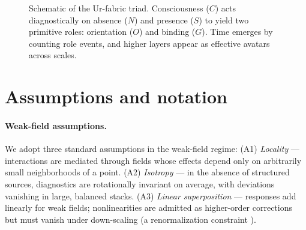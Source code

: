 \documentclass[12pt,a4paper,oneside]{scrreprt}
\begin{document}
\begin{figure}[ht]
\centering
{}
\caption{Schematic of the Ur-fabric triad. Consciousness ($C$) acts diagnostically on absence ($N$) and presence ($S$) to yield two primitive roles: orientation ($O$) and binding ($G$). Time emerges by counting role events, and higher layers appear as effective avatars across scales.}
\label{fig:ur-fabric-triad}
\end{figure}

\section{Assumptions and notation}\label{sec:ur-assumptions}

\paragraph{Weak-field assumptions.} 
We adopt three standard assumptions in the weak-field regime:  
(A1) \emph{Locality} --- interactions are mediated through fields whose effects depend only on arbitrarily small neighborhoods of a point.  
(A2) \emph{Isotropy} --- in the absence of structured sources, diagnostics are rotationally invariant on average, with deviations vanishing in large, balanced stacks.  
(A3) \emph{Linear superposition} --- responses add linearly for weak fields; nonlinearities are admitted as higher-order corrections but must vanish under down-scaling (a renormalization constraint \citep{Wilson1971RG,Kadanoff1966}).  
\end{document}
